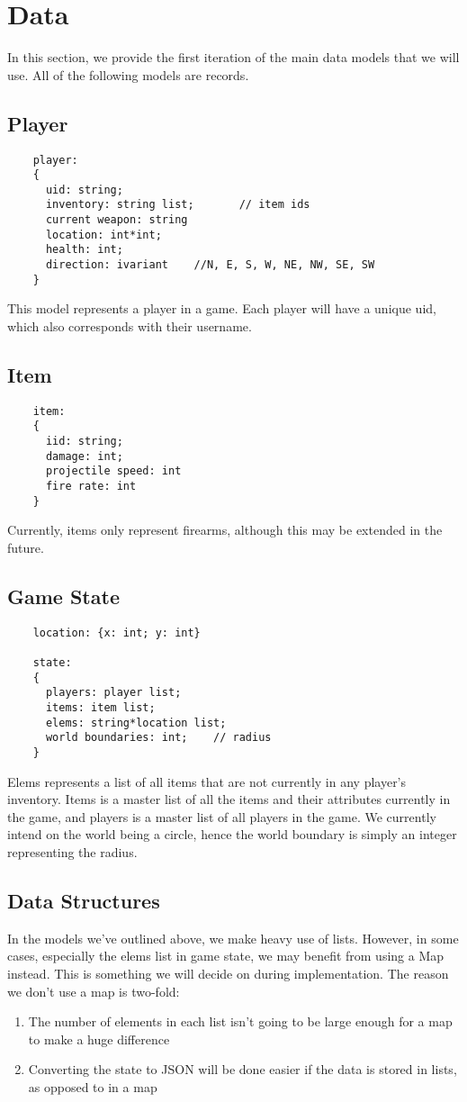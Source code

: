 \documentclass{article}
\begin{document}
    \section{Data}
    	In this section, we provide the first iteration of the main data models that we will use. All of the following models are records.

	\subsection{Player}
	\begin{verbatim}
	player:
	{
	  uid: string;
	  inventory: string list;    	// item ids
	  current weapon: string
	  location: int*int;
	  health: int;
	  direction: ivariant    //N, E, S, W, NE, NW, SE, SW
	}
	\end{verbatim}
	This model represents a player in a game. Each player will have a unique uid, which also corresponds with their username.

	\subsection{Item}
	\begin{verbatim}
	item:
	{
	  iid: string;
	  damage: int;
	  projectile speed: int
	  fire rate: int
	}
	\end{verbatim}
	Currently, items only represent firearms, although this may be extended in the future.

	\subsection{Game State}
	\begin{verbatim}
	location: {x: int; y: int}

	state:
	{
	  players: player list;
	  items: item list;
	  elems: string*location list;
	  world boundaries: int;	// radius
	}
	\end{verbatim}
	Elems represents a list of all items that are not currently in any player's inventory. Items is a master list of all the items and their attributes currently in the game, and players is a master list of all players in the game. We currently intend on the world being a circle, hence the world boundary is simply an integer representing the radius.

    \subsection{Data Structures}
    In the models we've outlined above, we make heavy use of lists. However, in some cases, especially the elems list in game state, we may benefit from using a Map instead. This is something we will decide on during implementation. The reason we don't use a map is two-fold:
    \begin{enumerate}
    	\item The number of elements in each list isn't going to be large enough for a map to make a huge difference
	\item Converting the state to JSON will be done easier if the data is stored in lists, as opposed to in a map
    \end{enumerate}
\end{document}
